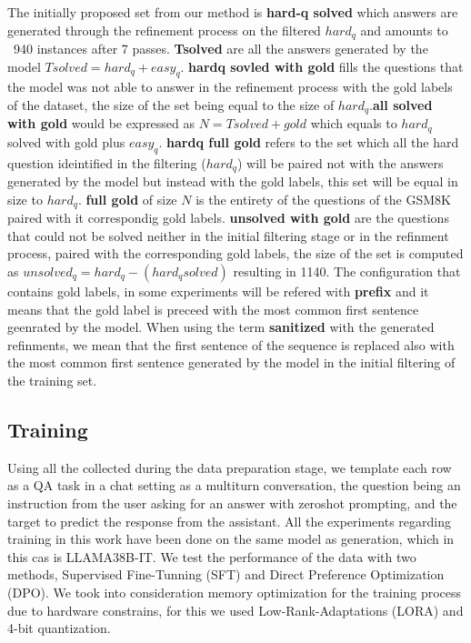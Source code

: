\documentclass[a4paper,10pt]{article}
\begin{document}
The initially proposed set from our method is \textbf{hard-q solved} which answers are generated through the refinement process on the filtered $hard_q$ and amounts to ~940 instances after 7 passes. \textbf{Tsolved} are all the answers generated by the model $Tsolved = hard_q + easy_q$.  \textbf{hardq sovled with gold} fills the questions that the model was not able to answer in the refinement process with the gold labels of the dataset, the size of the set being equal to the size of $hard_q$.\textbf{all solved with gold} would be expressed as $N = Tsolved + gold$ which equals to $hard_q$ solved with gold plus $easy_q$. \textbf{hardq full gold} refers to the set which all the hard question ideintified in the filtering ($hard_q$) will be paired not with the answers generated by the model but instead with the gold labels, this set will be equal in size to $hard_q$. \textbf{full gold} of size $N$ is the entirety of the questions of the GSM8K paired with it correspondig gold labels. \textbf{unsolved with gold} are the questions that could not be solved neither in the initial filtering stage or in the refinment process, paired with the corresponding gold labels, the size of the set is computed as $unsolved_q = hard_q - (hard_q solved)$ resulting in 1140. The configuration that contains gold labels, in some experiments will be refered with \textbf{prefix} and it means that the gold label is preceed with the most common first sentence geenrated by the model. When using the term \textbf{sanitized} with the generated refinments, we mean that the first sentence of the sequence is replaced also with the most common first sentence generated by the model in the initial filtering of the training set.
\subsection{Training}
Using all the collected during the data preparation stage, we template each row as a QA task in a chat setting as a multiturn conversation, the question being an instruction from the user asking for an answer with zeroshot prompting, and the target to predict the response from the assistant. All the experiments regarding training in this work have been done on the same model as generation, which in this cas is LLAMA38B-IT. We test the performance of the data with two methods, Supervised Fine-Tunning (SFT) and Direct Preference Optimization (DPO). We took into consideration memory optimization for the training process due to hardware constrains, for this we used Low-Rank-Adaptations (LORA) and 4-bit quantization.
\end{document}
